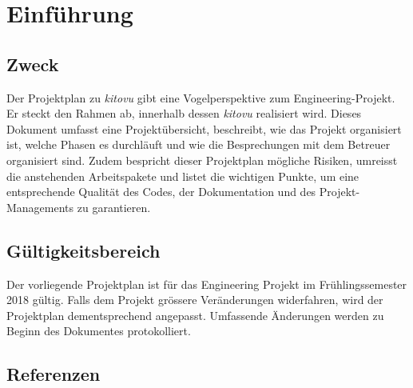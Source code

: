 \documentclass[a4paper]{article}
\let\oldsection\section
\renewcommand\section{\clearpage\oldsection}
\begin{document}
\section{Einführung}
\subsection{Zweck}
Der Projektplan zu \emph{kitovu} gibt eine Vogelperspektive zum Engineering-Projekt. Er steckt den Rahmen ab, innerhalb dessen \emph{kitovu} realisiert wird. Dieses Dokument umfasst eine Projektübersicht, beschreibt, wie das Projekt organisiert ist, welche Phasen es durchläuft und wie die Besprechungen mit dem Betreuer organisiert sind. Zudem bespricht dieser Projektplan mögliche Risiken, umreisst die anstehenden Arbeitspakete und listet die wichtigen Punkte, um eine entsprechende Qualität des Codes, der Dokumentation und des Projekt-Managements zu garantieren.

\subsection{Gültigkeitsbereich}
Der vorliegende Projektplan ist für das Engineering Projekt im Frühlingssemester 2018 gültig. Falls dem Projekt grössere Veränderungen widerfahren, wird der Projektplan dementsprechend angepasst. Umfassende Änderungen werden zu Beginn des Dokumentes protokolliert.

\subsection{Referenzen}

\end{document}
